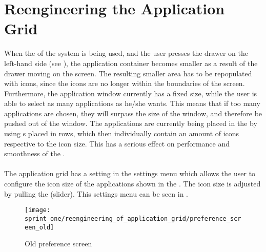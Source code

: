
\section{Reengineering the Application Grid}
\label{sec:reengineering_of_application_grid}


When the \launcher of the \giraf system is being used, and the user presses the drawer on the left-hand side (see ), the application container becomes smaller as a result of the drawer moving on the screen. The resulting smaller area has to be repopulated with icons, since the icons are no longer within the boundaries of the screen. Furthermore, the application window currently has a fixed size, while the user is able to select as many applications as he/she wants. This means that if too many applications are chosen, they will surpass the size of the window, and therefore be pushed out of the window. The applications are currently being placed in the \launcher by using s placed in rows, which then individually contain an amount of icons respective to the icon size. This has a serious effect on performance and smoothness of the \launcher. 
\\\\
The application grid has a setting in the settings menu which allows the user to configure the icon size of the applications shown in the \launcher. The icon size is adjusted by pulling the  (slider). This settings menu can be seen in .

\begin{figure}[!htbp]
    \centering
    \texttt{[image: sprint\_one/reengineering\_of\_application\_grid/preference\_screen\_old]}
    \caption{Old preference screen}
    \label{fig:preference_screen_old}
\end{figure}

